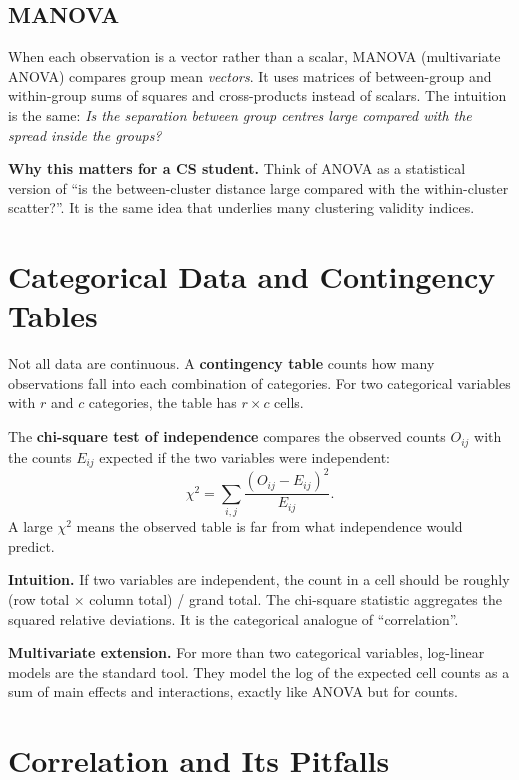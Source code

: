 \documentclass[11pt,a4paper]{article}
\begin{document}
\subsection{MANOVA}
When each observation is a vector rather than a scalar, MANOVA
(multivariate ANOVA) compares group mean \emph{vectors}.  It uses
matrices of between-group and within-group sums of squares and
cross-products instead of scalars.  The intuition is the same:
\emph{Is the separation between group centres large compared with the
spread inside the groups?}

\textbf{Why this matters for a CS student.}  Think of ANOVA as a
statistical version of ``is the between-cluster distance large
compared with the within-cluster scatter?''.  It is the same idea
that underlies many clustering validity indices.

\section{Categorical Data and Contingency Tables}

Not all data are continuous.  A \textbf{contingency table} counts how
many observations fall into each combination of categories.
For two categorical variables with $r$ and $c$ categories, the table
has $r\times c$ cells.

The \textbf{chi-square test of independence} compares the observed
counts $O_{ij}$ with the counts $E_{ij}$ expected if the two variables
were independent:
\[
\chi^2 = \sum_{i,j}\frac{(O_{ij}-E_{ij})^2}{E_{ij}}.
\]
A large $\chi^2$ means the observed table is far from what independence
would predict.

\textbf{Intuition.}  If two variables are independent, the count in a
cell should be roughly (row total $\times$ column total) / grand total.
The chi-square statistic aggregates the squared relative deviations.
It is the categorical analogue of ``correlation''.

\textbf{Multivariate extension.}  For more than two categorical
variables, log-linear models are the standard tool.  They model the
log of the expected cell counts as a sum of main effects and
interactions, exactly like ANOVA but for counts.

\section{Correlation and Its Pitfalls}
\end{document}
